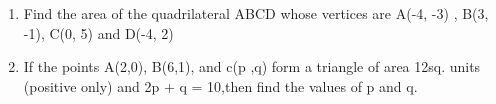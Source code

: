 \begin{enumerate}
\item  Find the area of the quadrilateral ABCD whose vertices are A(-4, -3) , B(3, -1), C(0, 5) and D(-4, 2)  
\item If the points A(2,0), B(6,1), and c(p ,q) form a triangle of area 12sq. units (positive only) and 2p + q = 10,then find the values of p and q.                 
\end{enumerate}
